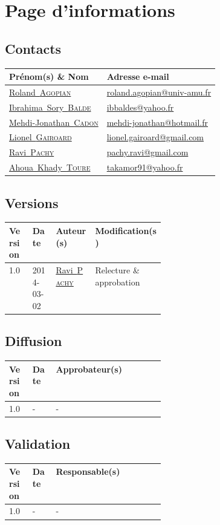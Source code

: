 \documentclass[11pt,fleqn]{book} %
\makeatletter
\newcommand{\rolandemail}{\href{mailto:roland.agopian@univ-amu.fr}{roland.agopian@univ-amu.fr}\xspace}
\newcommand{\raviemail}{\href{mailto:pachy.ravi@gmail.com}{pachy.ravi@gmail.com}\xspace}
\newcommand{\mjemail}{\href{mailto:mehdi-jonathan@hotmail.fr}{mehdi-jonathan@hotmail.fr}\xspace}
\newcommand{\lionelemail}{\href{mailto:lionel.gairoard@gmail.com}{lionel.gairoard@gmail.com}\xspace}
\newcommand{\ibrahimaemail}{\href{mailto:ibbaldes@yahoo.fr}{ibbaldes@yahoo.fr}\xspace}
\newcommand{\khadyemail}{\href{mailto:takamor91@yahoo.fr}{takamor91@yahoo.fr}\xspace}
\newcommand{\roland}{\href{mailto:roland.agopian@univ-amu.fr}{Roland~\textsc{Agopian}}\xspace}
\newcommand{\ravi}{\href{mailto:pachy.ravi@gmail.com}{Ravi~\textsc{Pachy}}\xspace}
\newcommand{\mj}{\href{mailto:mehdi-jonathan@hotmail.fr}{Mehdi-Jonathan~\textsc{Cadon}}\xspace}
\newcommand{\lionel}{\href{mailto:lionel.gairoard@gmail.com}{Lionel~\textsc{Gairoard}}\xspace}
\newcommand{\ibrahima}{\href{mailto:ibbaldes@yahoo.fr}{Ibrahima~Sory~\textsc{Balde}}\xspace}
\newcommand{\khady}{\href{mailto:takamor91@yahoo.fr}{Ahoua~Khady~\textsc{Toure}}\xspace}
\makeatother
\begin{document}
\chapter*{Page d'informations}

\section*{Contacts}
\begin{tabularx}{\linewidth}{X X}
	\toprule
	Prénom(s) \& Nom & Adresse e-mail \\
	\midrule
	\roland & \rolandemail \\
	\hline
	\ibrahima & \ibrahimaemail \\
	\hline
	\mj & \mjemail \\
	\hline
	\lionel & \lionelemail \\
	\hline
	\ravi & \raviemail \\
	\hline
	\khady & \khadyemail \\
	\bottomrule
\end{tabularx}

\section*{Versions}
\begin{tabularx}{\linewidth}{m{0.15\linewidth} m{0.15\linewidth} X X}
	\toprule
	Version & Date & Auteur(s) & Modification(s) \\
	\midrule
	1.0 & 2014-03-02 & \ravi & Relecture \& approbation \\
	\bottomrule
\end{tabularx}

\section*{Diffusion}
\begin{tabularx}{\linewidth}{m{0.15\linewidth} m{0.15\linewidth} X}
	\toprule
	Version & Date & Approbateur(s) \\
	\midrule
	1.0 & - & - \\
	\bottomrule
\end{tabularx}

\section*{Validation}
\begin{tabularx}{\linewidth}{m{0.15\linewidth} m{0.15\linewidth} X}
	\toprule
	Version & Date & Responsable(s) \\
	\midrule
	1.0 & - & - \\
	\bottomrule
\end{tabularx}
\end{document}
